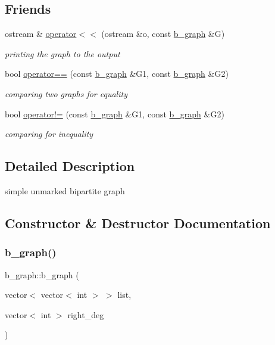 \subsection*{Friends}
\begin{DoxyCompactItemize}
\item 
ostream \& \hyperlink{classb__graph_a0635d59bf5b2d1df3d3dd2beef14ac6e}{operator$<$$<$} (ostream \&o, const \hyperlink{classb__graph}{b\+\_\+graph} \&G)
\begin{DoxyCompactList}\small\item\em printing the graph to the output \end{DoxyCompactList}\item 
bool \hyperlink{classb__graph_adf87735e8372a81049b347b1fdd23484}{operator==} (const \hyperlink{classb__graph}{b\+\_\+graph} \&G1, const \hyperlink{classb__graph}{b\+\_\+graph} \&G2)
\begin{DoxyCompactList}\small\item\em comparing two graphs for equality \end{DoxyCompactList}\item 
bool \hyperlink{classb__graph_ab90cd92a2e8f077e4ae18c568bcddd1a}{operator!=} (const \hyperlink{classb__graph}{b\+\_\+graph} \&G1, const \hyperlink{classb__graph}{b\+\_\+graph} \&G2)
\begin{DoxyCompactList}\small\item\em comparing for inequality \end{DoxyCompactList}\end{DoxyCompactItemize}


\subsection{Detailed Description}
simple unmarked bipartite graph 

\subsection{Constructor \& Destructor Documentation}
\mbox{\label{classb__graph_a6032fbf9681d275260dd9a8587447e61}} 
\subsubsection{\texorpdfstring{b\+\_\+graph()}{b\_graph()}}
{\footnotesize\ttfamily b\+\_\+graph\+::b\+\_\+graph (\begin{DoxyParamCaption}\item[{vector$<$ vector$<$ int $>$ $>$}]{list,  }\item[{vector$<$ int $>$}]{right\+\_\+deg }\end{DoxyParamCaption})}



